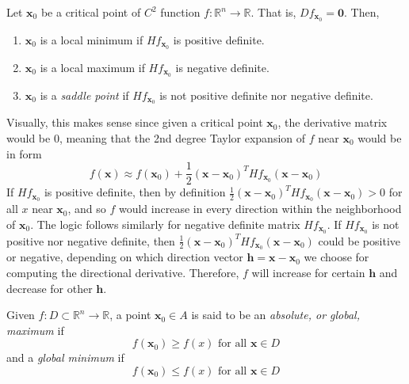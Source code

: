   \begin{theorem}
    Let $\mathbf{x}_0$ be a critical point of $C^2$ function $f: \mathbb{R}^n \longrightarrow \mathbb{R}$. That is, $D f_{\mathbf{x}_0} = \mathbf{0}$. Then, 
    \begin{enumerate}
      \item $\mathbf{x}_0$ is a local minimum if $H f_{\mathbf{x}_0}$ is positive definite.
      \item $\mathbf{x}_0$ is a local maximum if $H f_{\mathbf{x}_0}$ is negative definite. \item $\mathbf{x}_0$ is a \textit{saddle point} if $H f_{\mathbf{x}_0}$ is not positive definite nor negative definite. 
    \end{enumerate}
  \end{theorem}

  Visually, this makes sense since given a critical point $\mathbf{x}_0$, the derivative matrix would be $0$, meaning that the 2nd degree Taylor expansion of $f$ near $\mathbf{x}_0$ would be in form
  \[f(\mathbf{x}) \approx f(\mathbf{x}_0) + \frac{1}{2} (\mathbf{x} - \mathbf{x}_0)^T H f_{\mathbf{x}_0} (\mathbf{x} - \mathbf{x}_0)\]
  If $H f_{\mathbf{x}_0}$ is positive definite, then by definition $\frac{1}{2} (\mathbf{x} - \mathbf{x}_0)^T H f_{\mathbf{x}_0} (\mathbf{x} - \mathbf{x}_0) > 0$ for all $x$ near $\mathbf{x}_0$, and so $f$ would increase in every direction within the neighborhood of $\mathbf{x}_0$. The logic follows similarly for negative definite matrix $H f_{\mathbf{x}_0}$. If $H f_{\mathbf{x}_0}$ is not positive nor negative definite, then $\frac{1}{2} (\mathbf{x} - \mathbf{x}_0)^T H f_{\mathbf{x}_0} (\mathbf{x} - \mathbf{x}_0)$ could be positive or negative, depending on which direction vector $\mathbf{h} = \mathbf{x} - \mathbf{x}_0$ we choose for computing the directional derivative. Therefore, $f$ will increase for certain $\mathbf{h}$ and decrease for other $\mathbf{h}$. 

  \begin{definition}
  Given $f: D \subset \mathbb{R}^n \longrightarrow \mathbb{R}$, a point $\mathbf{x}_0 \in A$ is said to be an \textit{absolute, or global, maximum} if 
  \[f(\mathbf{x}_0) \geq f(x) \text{ for all } \mathbf{x} \in D\]
  and a \textit{global minimum} if 
  \[f(\mathbf{x}_0) \leq f(x) \text{ for all } \mathbf{x} \in D\]
  \end{definition}

